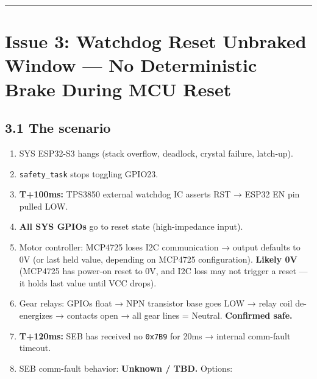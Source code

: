 \documentclass[12pt,a4paper,oneside]{report}
\providecommand{\tightlist}{\setlength{\itemsep}{0pt}\setlength{\parskip}{0pt}}
\begin{document}
\begin{center}\rule{0.5\linewidth}{0.5pt}\end{center}

\section{Issue 3: Watchdog Reset Unbraked Window --- No Deterministic Brake
During MCU
Reset}\label{issue-3-watchdog-reset-unbraked-window-no-deterministic-brake-during-mcu-reset}

\subsection{3.1 The scenario}\label{the-scenario-1}

\begin{enumerate}
\def\labelenumi{\arabic{enumi}.}
\tightlist
\item
  SYS ESP32-S3 hangs (stack overflow, deadlock, crystal failure, latch-up).
\item
  \texttt{safety\_task} stops toggling GPIO23.
\item
  \textbf{T+100ms:} TPS3850 external watchdog IC asserts RST → ESP32 EN pin
  pulled LOW.
\item
  \textbf{All SYS GPIOs} go to reset state (high-impedance input).
\item
  Motor controller: MCP4725 loses I2C communication → output defaults to 0V (or
  last held value, depending on MCP4725 configuration). \textbf{Likely 0V}
  (MCP4725 has power-on reset to 0V, and I2C loss may not trigger a reset --- it
  holds last value until VCC drops).
\item
  Gear relays: GPIOs float → NPN transistor base goes LOW → relay coil
  de-energizes → contacts open → all gear lines = Neutral. \textbf{Confirmed
  safe.}
\item
  \textbf{T+120ms:} SEB has received no \texttt{0x7B9} for 20ms → internal
  comm-fault timeout.
\item
  SEB comm-fault behavior: \textbf{Unknown / TBD.} Options:


\end{enumerate}
\end{document}
